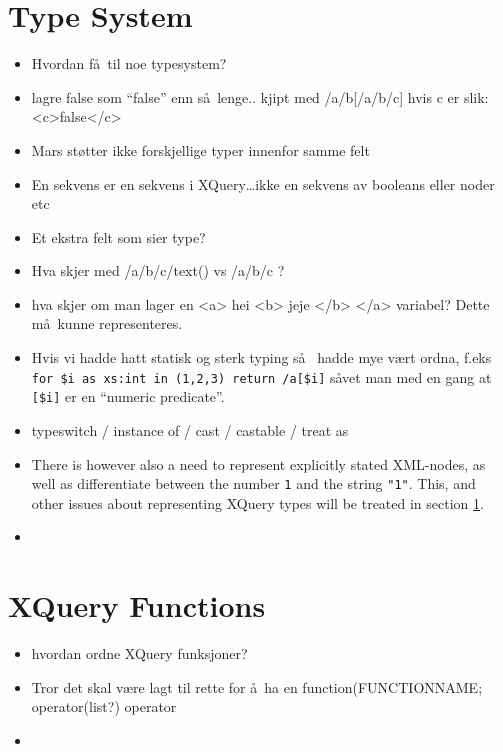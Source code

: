 \section{Type System}
\label{sect:disc:typeSystem}
\begin{itemize}
  \item Hvordan f\aa~til noe typesystem?
  \item lagre false som ``false'' enn s\aa~lenge.. kjipt med /a/b[/a/b/c] hvis c er slik: <c>false</c>
  \item Mars st\o tter ikke forskjellige typer innenfor samme felt
  \item En sekvens er en sekvens i XQuery\ldots ikke en sekvens av booleans
  eller noder etc
  \item Et ekstra felt som sier type?
  \item Hva skjer med /a/b/c/text() vs /a/b/c ?
  \item hva skjer om man lager en <a> hei <b> jeje </b> </a> variabel? Dette
  m\aa~kunne representeres.
  \item Hvis vi hadde hatt statisk og sterk typing s\aa~ hadde mye v\ae rt
  ordna, f.eks \verb!for $i as xs:int in (1,2,3) return /a[$i]! s\aa vet man
  med en gang at \verb![$i]! er en ``numeric predicate''.
  \item typeswitch / instance of / cast / castable / treat as
  \item There is however also a need to represent explicitly stated XML-nodes, as well
	as differentiate between the number \texttt{1} and the string \texttt{"1"}.
	This, and other issues about representing XQuery types will be treated in
	section \ref{sect:disc:typeSystem}.  \item 
\end{itemize}

\section{XQuery Functions}
\label{sect:disc:functions}
\begin{itemize}
  \item hvordan ordne XQuery funksjoner?
  \item Tror det skal v\ae re lagt til rette for \aa~ha en \textsf{function(FUNCTIONNAME; operator(list?)} operator
  \item 
\end{itemize}

